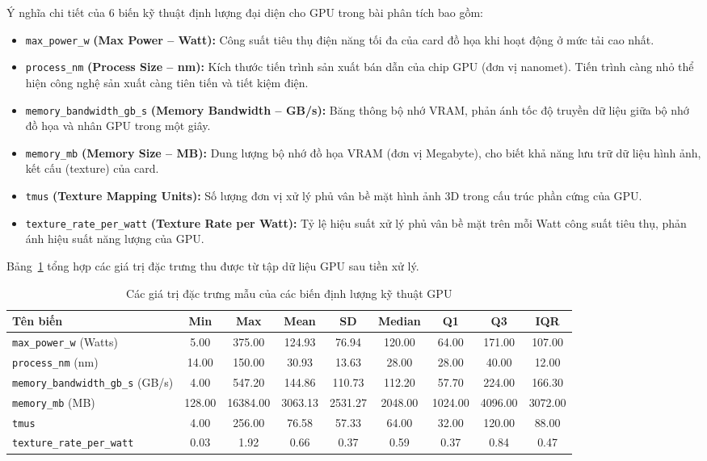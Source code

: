 \documentclass[12pt,a4paper]{article}
\providecommand{\tightlist}{\setlength{\itemsep}{0pt}\setlength{\parskip}{0pt}}
\begin{document}
Ý nghĩa chi tiết của 6 biến kỹ thuật định lượng đại diện cho GPU trong bài phân tích bao gồm:
\begin{itemize}\tightlist
    \item \texttt{max\_power\_w} \textbf{(Max Power -- Watt):} Công suất tiêu thụ điện năng tối đa của card đồ họa khi hoạt động ở mức tải cao nhất.
    \item \texttt{process\_nm} \textbf{(Process Size -- nm):} Kích thước tiến trình sản xuất bán dẫn của chip GPU (đơn vị nanomet). Tiến trình càng nhỏ thể hiện công nghệ sản xuất càng tiên tiến và tiết kiệm điện.
    \item \texttt{memory\_bandwidth\_gb\_s} \textbf{(Memory Bandwidth -- GB/s):} Băng thông bộ nhớ VRAM, phản ánh tốc độ truyền dữ liệu giữa bộ nhớ đồ họa và nhân GPU trong một giây.
    \item \texttt{memory\_mb} \textbf{(Memory Size -- MB):} Dung lượng bộ nhớ đồ họa VRAM (đơn vị Megabyte), cho biết khả năng lưu trữ dữ liệu hình ảnh, kết cấu (texture) của card.
    \item \texttt{tmus} \textbf{(Texture Mapping Units):} Số lượng đơn vị xử lý phủ vân bề mặt hình ảnh 3D trong cấu trúc phần cứng của GPU.
    \item \texttt{texture\_rate\_per\_watt} \textbf{(Texture Rate per Watt):} Tỷ lệ hiệu suất xử lý phủ vân bề mặt trên mỗi Watt công suất tiêu thụ, phản ánh hiệu suất năng lượng của GPU.
\end{itemize}

Bảng~\ref{tab:gpu_descriptive_stats} tổng hợp các giá trị đặc trưng thu được từ tập dữ liệu GPU sau tiền xử lý.

\begin{table}[H]
    \centering
    \footnotesize
    \setlength{\tabcolsep}{4.5pt}
    \caption{Các giá trị đặc trưng mẫu của các biến định lượng kỹ thuật GPU}
    \label{tab:gpu_descriptive_stats}
    \renewcommand{\arraystretch}{1.3}
    \begin{tabular}{|l|c|c|c|c|c|c|c|c|}
        \hline
        \rowcolor{TableHead}
        \textbf{Tên biến} & \textbf{Min} & \textbf{Max} & \textbf{Mean} & \textbf{SD} & \textbf{Median} & \textbf{Q1} & \textbf{Q3} & \textbf{IQR} \\ \hline
        \texttt{max\_power\_w} (Watts) & 5.00 & 375.00 & 124.93 & 76.94 & 120.00 & 64.00 & 171.00 & 107.00 \\ \hline
        \texttt{process\_nm} (nm) & 14.00 & 150.00 & 30.93 & 13.63 & 28.00 & 28.00 & 40.00 & 12.00 \\ \hline
        \texttt{memory\_bandwidth\_gb\_s} (GB/s) & 4.00 & 547.20 & 144.86 & 110.73 & 112.20 & 57.70 & 224.00 & 166.30 \\ \hline
        \texttt{memory\_mb} (MB) & 128.00 & 16384.00 & 3063.13 & 2531.27 & 2048.00 & 1024.00 & 4096.00 & 3072.00 \\ \hline
        \texttt{tmus} & 4.00 & 256.00 & 76.58 & 57.33 & 64.00 & 32.00 & 120.00 & 88.00 \\ \hline
        \texttt{texture\_rate\_per\_watt} & 0.03 & 1.92 & 0.66 & 0.37 & 0.59 & 0.37 & 0.84 & 0.47 \\ \hline
    \end{tabular}
\end{table}
\end{document}
